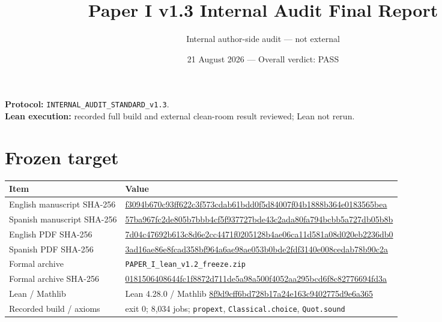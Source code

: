 \documentclass[11pt]{article}
\title{Paper I v1.3 Internal Audit Final Report}
\author{Internal author-side audit --- not external}
\date{21 August 2026 --- Overall verdict: PASS}
\begin{document}
\maketitle
\textbf{Protocol:} \texttt{INTERNAL\_AUDIT\_STANDARD\_v1.3}.\\
\textbf{Lean execution:} recorded full build and external clean-room result reviewed; Lean not rerun.

\section{Frozen target}
\small
\begin{longtable}{p{.29\linewidth}p{.64\linewidth}}
\toprule Item & Value \\ \midrule
English manuscript SHA-256 & \url{f3094b670c93ff622c3f573cdab61bdd0f5d84007f04b1888b364e0183565bea} \\
Spanish manuscript SHA-256 & \url{57ba967fc2de805b7bbb4cf5f937727bde43c2ada80fa794bcbb5a727db05b8b} \\
English PDF SHA-256 & \url{7d04c47692b613c8d6e2cc4471f0205128b4ae06ca11d581a08d020eb2236db0} \\
Spanish PDF SHA-256 & \url{3ad16ae86e8fcad358bf964a6ae98ae053b0bde2fdf3140e008cedab78b90c2a} \\
Formal archive & \texttt{PAPER\_I\_lean\_v1.2\_freeze.zip} \\
Formal archive SHA-256 & \url{0181506408644fc1f8872d711de5a98a500f4052aa295bcd6f8c82776694fd3a} \\
Lean / Mathlib & Lean 4.28.0 / Mathlib \url{8f9d9cff6bd728b17a24e163c9402775d9e6a365} \\
Recorded build / axioms & exit 0; 8,034 jobs; \texttt{propext}, \texttt{Classical.choice}, \texttt{Quot.sound} \\
\bottomrule
\end{longtable}
\normalsize
\end{document}

